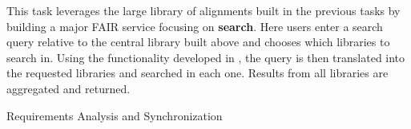 \begin{workpackage}[id=alignment,wphases=0-48,type=RTD,
  short=Concept Alignment,%
  title=Concept Alignment,
  lead=Pra,
  PraRM=10]
\begin{tasklist}
\begin{task}[id=alignsearch,title=FAIR Services: Search across Libraries,lead=Fau,FauRM=12]
This task leverages the large library of alignments built in the previous tasks by building a major FAIR service focusing on \textbf{search}.
Here users enter a search query relative to the central library built above and chooses which libraries to search in.
Using the functionality developed in , the query is then translated into the requested libraries and searched in each one.
Results from all libraries are aggregated and returned.
\end{task}

\end{tasklist}

\begin{wpdelivs}
  \begin{wpdeliv}[due=3,miles=startup,id=requirements,dissem=PU,nature=DEM,lead=Inr]
      {Requirements Analysis and Synchronization}
\end{wpdeliv}
\end{wpdelivs}
\end{workpackage}

